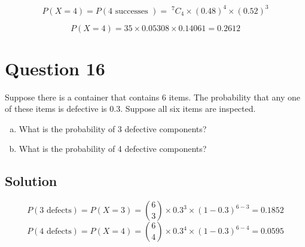 \documentclass[a4paper,12pt]{article}
\begin{document}
	
	
	
	\[ P(X=4) = P(4 \mbox{ successes }) = \;^7C_4  \times (0.48)^{4} \times (0.52)^{3}\]
	
	\[ P(X=4) = 35 \times 0.05308 \times  0.14061 =  {0.2612} \]
\section*{Question 16}
	Suppose there is a container that contains 6 items.  The probability that any one of these items is defective is 0.3. Suppose all six items are inspected. 
	\begin{enumerate}[(a)]
		\item What is the probability of 3 defective components?
		\item What is the probability of 4 defective components?
	\end{enumerate}
\subsection*{Solution}	
	\[ P(3\text{ defects}) = P(X = 3) = {6\choose 3} \times 0.3^3 \times  (1-0.3)^{6-3} = 0.1852 \]
	\[ P(4\text{ defects})  = P(X = 4) = {6\choose 4}\times 0.3^4\times  (1-0.3)^{6-4} = 0.0595 \]
\end{document}
